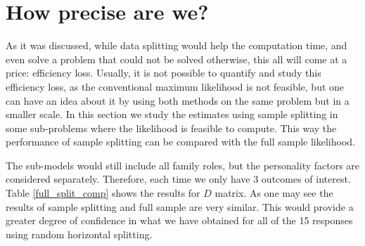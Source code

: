 \documentclass[11pt,a5paper,twoside]{book}
\begin{document}
\section{How precise are we?}
\label{how_good_sec}

As it was discussed, while data splitting would help the computation time, and even solve a problem that could not be solved otherwise, this all will come at a price: efficiency loss. Usually, it is not possible to quantify and study this efficiency loss, as the conventional maximum likelihood is not feasible, but one can have an idea about it by using both methods on the same problem but in a smaller scale. In this section we study the estimates using sample splitting in some sub-problems where the likelihood is feasible to compute. This way the performance of sample splitting can be compared with the full sample likelihood. 

The sub-models would still include all family roles, but the personality factors are considered separately. Therefore, each time we only have 3 outcomes of interest. Table \ref{full_split_comp} shows the results for $D$ matrix. As one may see the results of sample splitting and full sample are very similar. This would provide a greater degree of confidence in what we have obtained for all of the 15 responses using random horizontal splitting.
\end{document}

